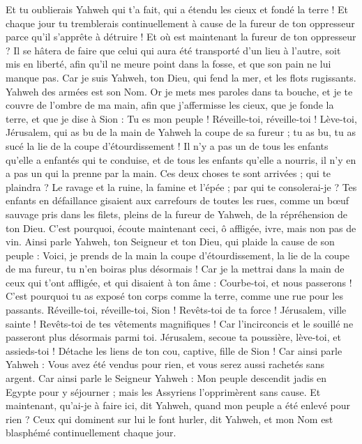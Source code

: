 \begin{multicols}{2}
Et tu oublierais Yahweh qui t'a fait, qui a étendu les cieux et fondé la terre ! Et chaque jour tu tremblerais continuellement à cause de la fureur de ton oppresseur parce qu'il s'apprête à détruire ! Et où est maintenant la fureur de ton oppresseur ?
Il se hâtera de faire que celui qui aura été transporté d'un lieu à l'autre, soit mis en liberté, afin qu'il ne meure point dans la fosse, et que son pain ne lui manque pas.
Car je suis Yahweh, ton Dieu, qui fend la mer, et les flots rugissants. Yahweh des armées est son Nom.
Or je mets mes paroles dans ta bouche, et je te couvre de l'ombre de ma main, afin que j'affermisse les cieux, que je fonde la terre, et que je dise à Sion : Tu es mon peuple !
Réveille-toi, réveille-toi ! Lève-toi, Jérusalem, qui as bu de la main de Yahweh la coupe de sa fureur ; tu as bu, tu as sucé la lie de la coupe d'étourdissement !
Il n'y a pas un de tous les enfants qu'elle a enfantés qui te conduise, et de tous les enfants qu'elle a nourris, il n'y en a pas un qui la prenne par la main.
Ces deux choses te sont arrivées ; qui te plaindra ? Le ravage et la ruine, la famine et l'épée ; par qui te consolerai-je ?
Tes enfants en défaillance gisaient aux carrefours de toutes les rues, comme un bœuf sauvage pris dans les filets, pleins de la fureur de Yahweh, de la répréhension de ton Dieu.
C'est pourquoi, écoute maintenant ceci, ô affligée, ivre, mais non pas de vin.
Ainsi parle Yahweh, ton Seigneur et ton Dieu, qui plaide la cause de son peuple : Voici, je prends de la main la coupe d'étourdissement, la lie de la coupe de ma fureur, tu n'en boiras plus désormais !
Car je la mettrai dans la main de ceux qui t'ont affligée, et qui disaient à ton âme : Courbe-toi, et nous passerons ! C'est pourquoi tu as exposé ton corps comme la terre, comme une rue pour les passants.
\VerseOne{}Réveille-toi, réveille-toi, Sion ! Revêts-toi de ta force ! Jérusalem, ville sainte ! Revêts-toi de tes vêtements magnifiques ! Car l'incirconcis et le souillé ne passeront plus désormais parmi toi. 
Jérusalem, secoue ta poussière, lève-toi, et assieds-toi ! Détache les liens de ton cou, captive, fille de Sion !
Car ainsi parle Yahweh : Vous avez été vendus pour rien, et vous serez aussi rachetés sans argent.
Car ainsi parle le Seigneur Yahweh : Mon peuple descendit jadis en Egypte pour y séjourner ; mais les Assyriens l'opprimèrent sans cause.
Et maintenant, qu'ai-je à faire ici, dit Yahweh, quand mon peuple a été enlevé pour rien ? Ceux qui dominent sur lui le font hurler, dit Yahweh, et mon Nom est blasphémé continuellement chaque jour.

\end{multicols}
